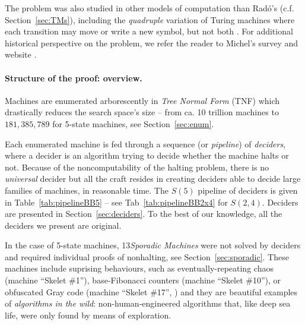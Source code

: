 \documentclass[a4paper,british]{article}
\theoremstyle{definition} %
\numberwithin{equation}{section}
\theoremstyle{definition} %
\newcommand{\BBtheFifthTNF}{181{,}385{,}789}
\newcommand{\rado}{Rad\'o\xspace}
\newcommand{\numSporadic}{13\xspace}
\begin{document}
The \BBfull problem was also studied in other models of computation than \rado's (c.f. Section~\ref{sec:TMs}), including the \textit{quadruple} variation of Turing machines where each transition may move or write a new symbol, but not both \cite{Ross2003,Ross2005}. For additional historical perspective on the \BBfull problem, we refer the reader to Michel's survey and website \cite{michel2019busy,PMichel_website}.

\paragraph{Structure of the proof: overview.} Machines are enumerated arborescently in \textit{Tree Normal Form} (TNF) \cite{Brady64} which drastically reduces the search space's size -- \eg from ca. 10 trillion machines to $\BBtheFifthTNF$ for 5-state machines, see Section~\ref{sec:enum}.

Each enumerated machine is fed through a sequence (or \textit{pipeline}) of \textit{deciders}, where a decider is an algorithm trying to decide whether the machine halts or not. Because of the noncomputability of the halting problem, there is no \textit{universal} decider but all the craft resides in creating deciders able to decide large families of machines, in reasonable time. The $S(5)$ pipeline of deciders is given in Table~\ref{tab:pipelineBB5} -- see Tab~\ref{tab:pipelineBB2x4} for $S(2,4)$. Deciders are presented in Section~\ref{sec:deciders}. To the best of our knowledge, all the deciders we present are original.

In the case of 5-state machines, \numSporadic \textit{Sporadic Machines} were not solved by deciders and required individual proofs of nonhalting, see Section~\ref{sec:sporadic}. These machines include suprising behaviours, such as eventually-repeating chaos (machine ``Skelet \#1''), base-Fibonacci counters (machine ``Skelet \#10''), or obfuscated Gray code (machine ``Skelet \#17'', \cite{xu2024skelet17fifthbusy}) and they are beautiful examples of \textit{algorithms in the wild}: non-human-engineered algorithms that, like deep sea life, were only found by means of exploration.
\end{document}
